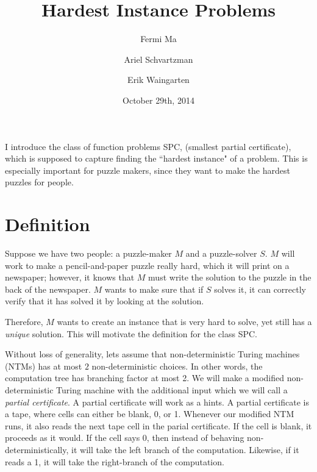 \documentclass[runningheads,a4paper]{llncs}
\date{October 29th, 2014}							%
\begin{document}
\title{Hardest Instance Problems}
\titlerunning{}

\author{Fermi Ma \and Ariel Schvartzman \and Erik Waingarten}
%


\maketitle

I introduce the class of function problems SPC, (smallest partial certificate), which is supposed to capture finding the ``hardest instance" of a problem. This is especially important for puzzle makers, since they want to make the hardest puzzles for people. 

\section{Definition}

Suppose we have two people: a puzzle-maker $M$ and a puzzle-solver $S$. $M$ will work to make a pencil-and-paper puzzle really hard, which it will print on a newspaper; however, it knows that $M$ must write the solution to the puzzle in the back of the newspaper. $M$ wants to make sure that if $S$ solves it, it can correctly verify that it has solved it by looking at the solution. 

Therefore, $M$ wants to create an instance that is very hard to solve, yet still has a \emph{unique} solution. This will motivate the definition for the class SPC. 

Without loss of generality, lets assume that non-deterministic Turing machines (NTMs) has at most $2$ non-deterministic choices. In other words, the computation tree has branching factor at most 2.  We will make a modified non-deterministic Turing machine with the additional input which we will call a \emph{partial certificate}. A partial certificate will work as a hints. A partial certificate is a tape, where cells can either be blank, 0, or 1. Whenever our modified NTM runs, it also reads the next tape cell in the parial certificate. If the cell is blank, it proceeds as it would. If the cell says 0, then instead of behaving non-deterministically, it will take the left branch of the computation. Likewise, if it reads a 1, it will take the right-branch of the computation.
\end{document}
